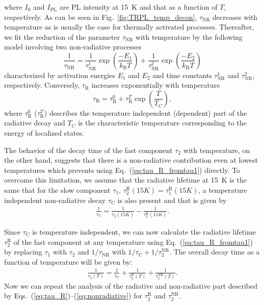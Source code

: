 {{\noindent where $I_0$ and $I_\mathrm{PL}$ are PL intensity at 15~K and that as a function of $T$, respectively. As can be seen in Fig.~\ref{fig:TRPL_temp_decon}, $\tau_\mathrm{NR}$ decreases with temperature as is usually the case for thermally activated processes. Thereafter, we fit the reduction of the parameter $\tau_\mathrm{NR}$ with temperature by the following model involving two non-radiative processes 
%
\begin{equation}
\frac{1}{\tau_\mathrm{NR}}=\frac{1}{\tau_\mathrm{NR}^1}\exp{\left(\frac{-E_1}{k_\mathrm{B}T}\right)} + \frac{1}{\tau_\mathrm{NR}^2}\exp{\left(\frac{-E_2}{k_\mathrm{B}T}\right)} \label{eq:nonradiative}
\end{equation}
%
characterized by activation energies $E_1$ and $E_2$ and time constants $\tau_\mathrm{NR}^1$ and $\tau_\mathrm{NR}^2$, respectively.
Conversely, $\tau_\mathrm{R}$ increases exponentially with temperature
%
\begin{equation}
\tau_\mathrm{R} = \tau_\mathrm{R}^0 + \tau_\mathrm{R}^T \exp{\left(\frac{T}{T_C}\right)}, \label{eq:tau_R} 
\end{equation}
%
where $ \tau_\mathrm{R}^0$ ($ \tau_\mathrm{R}^T$) describes the temperature independent (dependent) part of the radiative decay and $T_C$ is the characteristic temperature corresponding to the energy of localized states. 

The behavior of the decay time of the fast component $\tau_2$ with temperature, on the other hand, suggests that there is a non-radiative contribution even at lowest temperatures which prevents using Eq.~(\ref{eq:tau_R_fromtau1}) directly. To overcome this limitation, we assume that the radiative lifetime at 15~K is the same that for the slow component $\tau_1$, $\tau_2^\mathrm{R}(15K)=\tau_1^\mathrm{R}(15K)$, a temperature independent non-radiative decay $\tau_\mathrm{C}$ is also present and that is given by
%
\begin{eqnarray}
\frac{1}{\tau_\mathrm{C}}=\frac{1}{\tau_2(15K)}-\frac{1}{\tau_2^\mathrm{R}(15K)}.\label{eq:tau_C}
\end{eqnarray}

Since $\tau_\mathrm{C}$ is temperature independent, we can now calculate the radiative lifetime $\tau_2^\mathrm{R}$ of the fast component at any temperature using Eq.~(\ref{eq:tau_R_fromtau1}) by replacing $\tau_1$ with $\tau_2$ and $1/\tau_\mathrm{NR}$ with $1/\tau_\mathrm{C}+1/\tau_2^\mathrm{NR}$. The overall decay time as a function of temperature will be given by:
\begin{eqnarray}
\frac{1}{\tau_2(T)}=\frac{1}{\tau_\mathrm{C}}+\frac{1}{\tau_2^\mathrm{R}(T)}+\frac{1}{\tau_2^\mathrm{NR}(T)}.
\end{eqnarray}
%
Now we can repeat the analysis of the radiative and non-radiative part described by Eqs.~(\ref{eq:tau_R})--(\ref{eq:nonradiative}) for $\tau_2^\mathrm{R}$ and $\tau_2^\mathrm{NR}$.

}}
